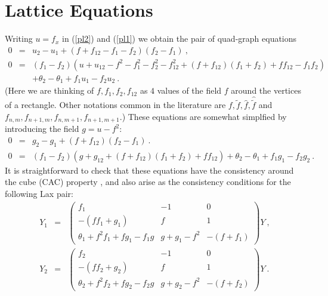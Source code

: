 \documentclass[12pt]{article}
\begin{document}
\section{Lattice Equations}

Writing $u=f_x$ in (\ref{pl2}) and (\ref{pl1}) we obtain the pair of quad-graph  equations 
\begin{eqnarray}
0  &=&  u_2-u_1 + (f + f_{12} - f_1 - f_2)(f_2-f_1)\ ,  \label{fu1} \\
0 &=& \left(f_1-f_2 \right)\left( u+u_{12}  - f^2 - f_1^2 - f_2^2  - f_{12}^2  +  (f+f_{12})(f_1+f_2) + ff_{12} -  f_1f_2  \right)
\nonumber \\ 
&& + \theta_2-\theta_1  + f_1u_{1} - f_2u_{2} \ . \label{fu2}
\end{eqnarray}
(Here we are thinking of $f,f_1,f_2,f_{12}$ as $4$ values of the field $f$ around the vertices of a rectangle. Other
notations common in the literature are $f,\tilde{f},\hat{f},\hat{\tilde{f}}$ and
$f_{n,m},f_{n+1,m},f_{n,m+1},f_{n+1,m+1}$.) These equations are somewhat simplfied by introducing the field  $g=u-f^2$: 
\begin{eqnarray}
0 &=&  g_2-g_1 + (f + f_{12})(f_2-f_1) \ .  \label{fg1} \\
0 &=& \left(f_1-f_2 \right)\left( g+g_{12}  +  (f+f_{12})(f_1+f_2) + ff_{12}  \right) + \theta_2-\theta_1  + f_1g_1 - f_2g_2 \ .
  \label{fg2}
\end{eqnarray}
It is straightforward to check that these equations 
have the consistency around the cube (CAC) property \cite{beq48}, and also arise as the 
consistency conditions for the following Lax pair: 
\begin{eqnarray*}
  Y_1 &=& \left( \begin{array}{ccc}
    f_1 &  -1 & 0  \\
    -(ff_1+g_1) & f & 1  \\
    \theta_1 + f^2f_1 +fg_1 - f_1g  & g+g_1-f^2 & -(f+f_1)  
    \end{array}\right)  Y \ , \\ 
  Y_2 &=& \left( \begin{array}{ccc}
    f_2 &  -1 & 0  \\
    -(ff_2+g_2) & f & 1  \\
    \theta_2 + f^2f_2 +fg_2 - f_2g  & g+g_2-f^2 & -(f+f_2)  
    \end{array}\right)  Y  \ .
\end{eqnarray*}
\end{document}
